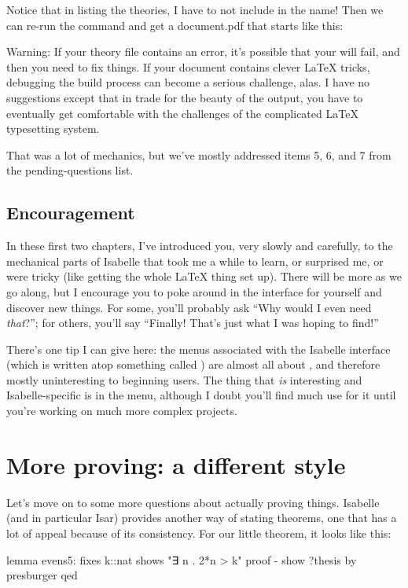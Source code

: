 Notice that in listing the theories, I have to not include  in the name! 
Then we can re-run the  command and get a document.pdf that starts like this:



Warning: If your theory file contains an error, it's possible that your  will fail, and then you need to fix things. If your document contains clever LaTeX tricks, debugging the build process can become a serious challenge, alas. I have no suggestions except that in trade for the beauty of the output, you have to eventually get comfortable with the challenges of the complicated LaTeX typesetting system.

That was a lot of mechanics, but we've mostly addressed items 5, 6, and 7 from the pending-questions list. 

\subsection{Encouragement}
In these first two chapters, I've introduced you, very slowly and carefully, to the mechanical parts of Isabelle that took me a while to learn, or surprised me, or were tricky (like getting the whole LaTeX thing set up). There will be more as we go along, but I encourage you to poke around in the interface for yourself and discover new things. For some, you'll probably ask ``Why would I even need \textit{that}?''; for others, you'll say ``Finally! That's just what I was hoping to find!'' 


There's one tip I can give here: the menus associated with the Isabelle interface (which is written atop something called ) are almost all about , and therefore mostly uninteresting to beginning users. The thing that \textit{is} interesting and Isabelle-specific is in the  menu, although I doubt you'll find much use for it until you're working on much more complex projects.


\section{More proving: a different style}

Let's move on to some more questions about actually proving things. 
Isabelle (and in particular Isar) provides another way of stating theorems, one that has a lot of appeal because of its consistency. For our little  theorem, it looks like this:
\begin{IS}    
lemma evens5:
  fixes k::nat
  shows "∃ n . 2*n > k"
proof -
  show ?thesis by presburger
qed
\end{IS}

